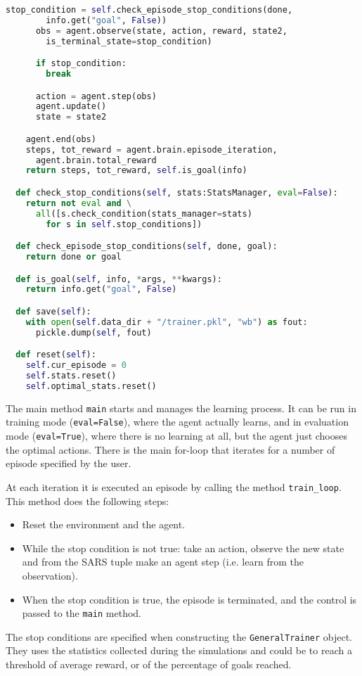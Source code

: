 \begin{lstlisting}[style=Python, language=Python, escapechar=£, label={code:trainer}, caption={The \texttt{Trainer} that implements the training loop.}]
      stop_condition = self.check_episode_stop_conditions(done,
        info.get("goal", False))
      obs = agent.observe(state, action, reward, state2,
        is_terminal_state=stop_condition)

      if stop_condition:
        break

      action = agent.step(obs)
      agent.update()
      state = state2

    agent.end(obs)
    steps, tot_reward = agent.brain.episode_iteration,
      agent.brain.total_reward
    return steps, tot_reward, self.is_goal(info)

  def check_stop_conditions(self, stats:StatsManager, eval=False):
    return not eval and \
      all([s.check_condition(stats_manager=stats)
        for s in self.stop_conditions])

  def check_episode_stop_conditions(self, done, goal):
    return done or goal

  def is_goal(self, info, *args, **kwargs):
    return info.get("goal", False)

  def save(self):
    with open(self.data_dir + "/trainer.pkl", "wb") as fout:
      pickle.dump(self, fout)

  def reset(self):
    self.cur_episode = 0
    self.stats.reset()
    self.optimal_stats.reset()
\end{lstlisting}
The main method \texttt{main} starts and manages the learning process. It can be run in training mode (\texttt{eval=False}), where the agent actually learns, and in evaluation mode (\texttt{eval=True}), where there is no learning at all, but the agent just chooses the optimal actions. There is the main for-loop that iterates for a number of episode specified by the user.

At each iteration it is executed an episode by calling the method \texttt{train\_loop}. This method does the following steps:
\begin{itemize}
	\item Reset the environment and the agent.
	\item While the stop condition is not true: take an action, observe the new state and from the SARS tuple make an agent step (i.e. learn from the observation).
	\item When the stop condition is true, the episode is terminated, and the control is passed to the \texttt{main} method.
\end{itemize}

The stop conditions are specified when constructing the \texttt{GeneralTrainer} object. They uses the statistics collected during the simulations and could be to reach a threshold of average reward, or of the percentage of goals reached.

